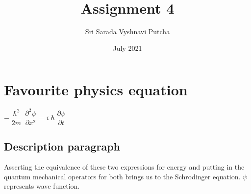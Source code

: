 \documentclass[a4paper,12pt]{article}
\begin{document}
\title{Assignment 4}
\author{Sri Sarada Vyshnavi Putcha }
\date{July 2021}
\maketitle
\section{Favourite physics equation}
 $-\dfrac{\hslash^2}{2m} \, \dfrac{\partial^2 \psi}{\partial x^2}$ = $i\hslash\dfrac{\partial\psi}{\partial t}$
\subsection{Description paragraph}
Asserting the equivalence of these two expressions for energy and putting in the quantum mechanical operators for both brings us to the Schrodinger equation.
$\psi$ represents wave function.
\end{document}
